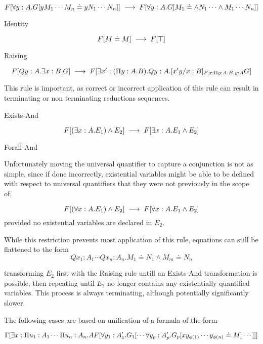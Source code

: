 \[
F[\forall y : A . G[y M_1 \cdots M_n \doteq y N_1 \cdots N_n  ]]
\;\longrightarrow\;
F[\forall y : A . G[ M_1 \doteq \wedge N_1 \cdots \wedge M_1 \cdots N_n ]]
\]

\begin{tcase}
Identity
\end{tcase}

\[
F[M \doteq M] 
\;\longrightarrow\;
F[\top]
\]

\begin{tcase}
Raising
\end{tcase}

\[
F[Q y : A . \exists x : B . G]
\;\longrightarrow\;
F[\exists x' : (\Pi y : A . B) . Q y : A . [x' y / x : B]_{F, x : \Pi y : A . B , y : A} G]
\]

This rule is important, as correct or 
incorrect application of this rule can result in 
terminating or non terminating reductions sequences.


\begin{tcase}
Exists-And
\end{tcase}

\[
F[(\exists x : A . E_1) \wedge E_2]
\;\longrightarrow\;
F[\exists x : A . E_1 \wedge E_2]
\]

\begin{tcase}
Forall-And
\end{tcase}

Unfortunately moving the universal quantifier to
capture a conjunction is not as simple, since
if done incorrectly, existential variables might be able
to be defined with respect to universal quantifiers that they
were not previously in the scope of.

\[
F[(\forall x : A . E_1) \wedge E_2]
\;\longrightarrow\;
F[\forall x : A . E_1 \wedge E_2]
\]
provided no existential variables are declared in $E_2$.

While this restriction prevents most application of this rule, 
equations can still be flattened to the form
\[
Qx_1:A_1\cdots Qx_n : A_n . M_1 \doteq N_1 \wedge M_m \doteq N_n
\]

transforming $E_2$ first with the Raising rule untill 
an Exists-And transformation is possible, then repeating  
until $E_2$ no longer contains any existentially 
quantified variables.  This process is always terminating,
although potentially significantly slower.   


The following cases are based on unification 
of a formula of the form

\[
\Gamma[
\exists x : \Pi u_1 : A_1 \cdots \Pi u_n : A_n . A 
\\
F[\forall y_1 : A'_1 . G_1 
[ \cdots \forall y_p : A'_p . G_p 
[ x y_{\phi(1)} \cdots y_{\phi(n)} \doteq M ]
\cdots
]]]
\]

